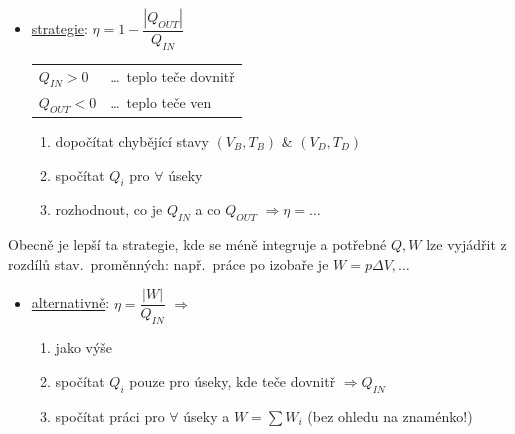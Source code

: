 \begin{minipage}{0.55\textwidth}
\begin{itemize}
  \item \underline{strategie}: \quad $\eta = 1 - \dfrac{|Q_{OUT}|}{Q_{IN}}$
  \begin{tabular}{ll}
    $Q_{IN} > 0$ & \dots\ teplo teče dovnitř \\
    $Q_{OUT} < 0$ & \dots\ teplo teče ven
  \end{tabular}
  \begin{enumerate}[label=\arabic*),start=0]
    \item dopočítat chybějící stavy $(V_B, T_B)$ \& $(V_D, T_D)$
    \item[$\Rightarrow$ 1)] spočítat $Q_i$ pro $\forall$ úseky
    \item rozhodnout, co je $Q_{IN}$ a co $Q_{OUT}$ $\Rightarrow \eta = \dots$
  \end{enumerate}
\end{itemize}
\end{minipage}
\begin{minipage}{0.43\textwidth}\color{Red}
Obecně je lepší ta strategie, kde se méně integruje a potřebné $Q, W$ lze vyjádřit z rozdílů stav.\ proměnných: např.\ práce po izobaře je $W = p\Delta V, \dots$
\end{minipage}

\begin{itemize}
  \item \underline{alternativně}: \quad $\eta = \dfrac{|W|}{Q_{IN}}$ \quad $\Rightarrow$
  \begin{enumerate}[label=\arabic*),start=0]
    \item jako výše
    \item spočítat $Q_i$ pouze pro úseky, kde teče dovnitř $\Rightarrow Q_{IN}$
    \item spočítat práci pro $\forall$ úseky a $W = \sum W_i$ (bez ohledu na znaménko!)
  \end{enumerate}
\end{itemize}


